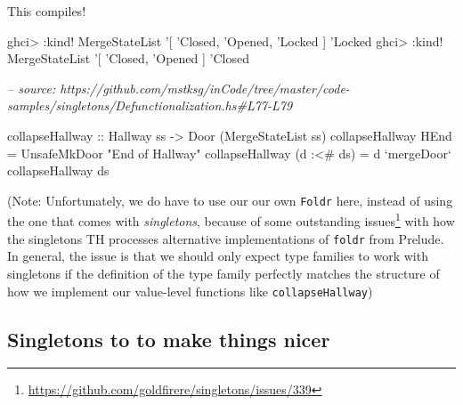 \documentclass[]{article}
\newenvironment{Shaded}{}{}
\newcommand{\CommentTok}[1]{\textcolor[rgb]{0.38,0.63,0.69}{\textit{#1}}}
\newcommand{\DataTypeTok}[1]{\textcolor[rgb]{0.56,0.13,0.00}{#1}}
\newcommand{\FunctionTok}[1]{\textcolor[rgb]{0.02,0.16,0.49}{#1}}
\newcommand{\NormalTok}[1]{#1}
\newcommand{\OtherTok}[1]{\textcolor[rgb]{0.00,0.44,0.13}{#1}}
\newcommand{\StringTok}[1]{\textcolor[rgb]{0.25,0.44,0.63}{#1}}
\renewcommand{\href}[2]{#2\footnote{\url{#1}}}
\begin{document}
This compiles!

\begin{Shaded}
\begin{Highlighting}[]
\NormalTok{ghci}\FunctionTok{>} \FunctionTok{:}\NormalTok{kind}\FunctionTok{!} \DataTypeTok{MergeStateList}\NormalTok{ '[ '}\DataTypeTok{Closed}\NormalTok{, '}\DataTypeTok{Opened}\NormalTok{, '}\DataTypeTok{Locked}\NormalTok{ ]}
\NormalTok{'}\DataTypeTok{Locked}
\NormalTok{ghci}\FunctionTok{>} \FunctionTok{:}\NormalTok{kind}\FunctionTok{!} \DataTypeTok{MergeStateList}\NormalTok{ '[ '}\DataTypeTok{Closed}\NormalTok{, '}\DataTypeTok{Opened}\NormalTok{ ]}
\NormalTok{'}\DataTypeTok{Closed}
\end{Highlighting}
\end{Shaded}

\begin{Shaded}
\begin{Highlighting}[]
\CommentTok{-- source: https://github.com/mstksg/inCode/tree/master/code-samples/singletons/Defunctionalization.hs#L77-L79}

\OtherTok{collapseHallway ::} \DataTypeTok{Hallway}\NormalTok{ ss }\OtherTok{->} \DataTypeTok{Door}\NormalTok{ (}\DataTypeTok{MergeStateList}\NormalTok{ ss)}
\NormalTok{collapseHallway }\DataTypeTok{HEnd}       \FunctionTok{=} \DataTypeTok{UnsafeMkDoor} \StringTok{"End of Hallway"}
\NormalTok{collapseHallway (d }\FunctionTok{:<#}\NormalTok{ ds) }\FunctionTok{=}\NormalTok{ d }\OtherTok{`mergeDoor`}\NormalTok{ collapseHallway ds}
\end{Highlighting}
\end{Shaded}

(Note: Unfortunately, we do have to use our our own \texttt{Foldr} here, instead
of using the one that comes with \emph{singletons}, because of some
\href{https://github.com/goldfirere/singletons/issues/339}{outstanding issues}
with how the singletons TH processes alternative implementations of
\texttt{foldr} from Prelude. In general, the issue is that we should only expect
type families to work with singletons if the definition of the type family
perfectly matches the structure of how we implement our value-level functions
like \texttt{collapseHallway})

\hypertarget{singletons-to-to-make-things-nicer}{%
\subsection{Singletons to to make things
nicer}\label{singletons-to-to-make-things-nicer}}
\end{document}
